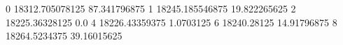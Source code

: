 0 18312.705078125 87.341796875
1 18245.185546875 19.822265625
2 18225.36328125 0.0
4 18226.43359375 1.0703125
6 18240.28125 14.91796875
8 18264.5234375 39.16015625
